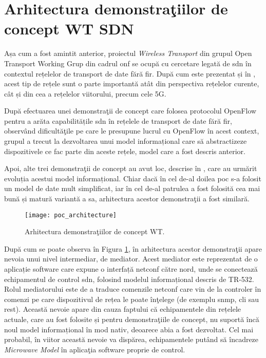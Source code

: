 \section{Arhitectura demonstraţiilor de concept WT SDN}

Așa cum a fost amintit anterior, proiectul \textit{Wireless Transport} din grupul Open Transport Working Grup din cadrul \gls{onf} se ocupă cu cercetare legată de \gls{sdn} în contextul rețelelor de transport de date fără fir. După cum este prezentat și în \cite{bercovich2015software, bernardos2014architecture}, acest tip de rețele sunt o parte importantă atât din perspectiva rețelelor curente, cât și din cea a rețelelor viitorului, precum cele 5G.

După efectuarea unei demonstraţii de concept \cite{onf2015_poc1} care folosea protocolul OpenFlow pentru a arăta capabilitățile \gls{sdn} în rețelele de transport de date fără fir, observând dificultăţile pe care le presupune lucrul cu OpenFlow în acest context, grupul a trecut la dezvoltarea unui model informațional care să abstractizeze dispozitivele ce fac parte din aceste rețele, model care a fost descris anterior.

Apoi, alte trei demonstraţii de concept au avut loc, descrise în \cite{onf2016_poc2, onf2016_poc3, onf2017_poc4}, care au urmărit evoluția acestui model informațional. Chiar dacă în cel de-al doilea \gls{poc} s-a folosit un model de date mult simplificat, iar în cel de-al patrulea a fost folosită cea mai bună și matură variantă a sa, arhitectura acestor demonstraţii a fost similară.

\begin{figure}[h]
	\centering
	\texttt{[image: poc\_architecture]}
	\caption{Arhitectura demonstraţiilor de concept WT.}
	\label{fig:poc_architecture}
\end{figure}

După cum se poate observa în Figura \ref{fig:poc_architecture}, în arhitectura acestor demonstraţii apare nevoia unui nivel intermediar, de mediator. Acest mediator este reprezentat de o aplicație software care expune o interfață \gls{netconf} către nord, unde se conectează echipamentul de control \gls{sdn}, folosind modelul informațional descris de TR-532. Rolul mediatorului este de a traduce comenzile \gls{netconf} care vin de la controler în comenzi pe care dispozitivul de rețea le poate înţelege (de exemplu \gls{snmp}, \gls{cli} sau \gls{rest}). Această nevoie apare din cauza faptului că echipamentele din rețelele actuale, care au fost folosite și pentru demonstraţiile de concept, nu suportă încă noul model informațional în mod nativ, deoarece abia a fost dezvoltat. Cel mai probabil, în viitor această nevoie va dispărea, echipamentele putând să încadreze \textit{Microwave Model} în aplicaţia software proprie de control.

